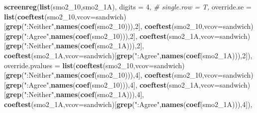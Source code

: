 \documentclass[
]{article}
\newenvironment{Shaded}{\begin{snugshade}}{\end{snugshade}}
\newcommand{\CommentTok}[1]{\textcolor[rgb]{0.56,0.35,0.01}{\textit{#1}}}
\newcommand{\DataTypeTok}[1]{\textcolor[rgb]{0.13,0.29,0.53}{#1}}
\newcommand{\DecValTok}[1]{\textcolor[rgb]{0.00,0.00,0.81}{#1}}
\newcommand{\KeywordTok}[1]{\textcolor[rgb]{0.13,0.29,0.53}{\textbf{#1}}}
\newcommand{\NormalTok}[1]{#1}
\newcommand{\StringTok}[1]{\textcolor[rgb]{0.31,0.60,0.02}{#1}}
\begin{document}
\begin{Shaded}
\begin{Highlighting}[]
\KeywordTok{screenreg}\NormalTok{(}\KeywordTok{list}\NormalTok{(smo2_}\DecValTok{10}\NormalTok{,smo2_1A), }\DataTypeTok{digits =} \DecValTok{4}\NormalTok{, }\CommentTok{# single.row = T,}
          \DataTypeTok{override.se =} \KeywordTok{list}\NormalTok{(}\KeywordTok{coeftest}\NormalTok{(smo2_}\DecValTok{10}\NormalTok{,}\DataTypeTok{vcov=}\NormalTok{sandwich)[}\KeywordTok{grep}\NormalTok{(}\StringTok{":Neither"}\NormalTok{,}\KeywordTok{names}\NormalTok{(}\KeywordTok{coef}\NormalTok{(smo2_}\DecValTok{10}\NormalTok{))),}\DecValTok{2}\NormalTok{],}
                             \KeywordTok{coeftest}\NormalTok{(smo2_}\DecValTok{10}\NormalTok{,}\DataTypeTok{vcov=}\NormalTok{sandwich)[}\KeywordTok{grep}\NormalTok{(}\StringTok{":Agree"}\NormalTok{,}\KeywordTok{names}\NormalTok{(}\KeywordTok{coef}\NormalTok{(smo2_}\DecValTok{10}\NormalTok{))),}\DecValTok{2}\NormalTok{],}
                             \KeywordTok{coeftest}\NormalTok{(smo2_1A,}\DataTypeTok{vcov=}\NormalTok{sandwich)[}\KeywordTok{grep}\NormalTok{(}\StringTok{":Neither"}\NormalTok{,}\KeywordTok{names}\NormalTok{(}\KeywordTok{coef}\NormalTok{(smo2_1A))),}\DecValTok{2}\NormalTok{],}
                             \KeywordTok{coeftest}\NormalTok{(smo2_1A,}\DataTypeTok{vcov=}\NormalTok{sandwich)[}\KeywordTok{grep}\NormalTok{(}\StringTok{":Agree"}\NormalTok{,}\KeywordTok{names}\NormalTok{(}\KeywordTok{coef}\NormalTok{(smo2_1A))),}\DecValTok{2}\NormalTok{]),}
          \DataTypeTok{override.pvalues =} \KeywordTok{list}\NormalTok{(}\KeywordTok{coeftest}\NormalTok{(smo2_}\DecValTok{10}\NormalTok{,}\DataTypeTok{vcov=}\NormalTok{sandwich)[}\KeywordTok{grep}\NormalTok{(}\StringTok{":Neither"}\NormalTok{,}\KeywordTok{names}\NormalTok{(}\KeywordTok{coef}\NormalTok{(smo2_}\DecValTok{10}\NormalTok{))),}\DecValTok{4}\NormalTok{],}
                                  \KeywordTok{coeftest}\NormalTok{(smo2_}\DecValTok{10}\NormalTok{,}\DataTypeTok{vcov=}\NormalTok{sandwich)[}\KeywordTok{grep}\NormalTok{(}\StringTok{":Agree"}\NormalTok{,}\KeywordTok{names}\NormalTok{(}\KeywordTok{coef}\NormalTok{(smo2_}\DecValTok{10}\NormalTok{))),}\DecValTok{4}\NormalTok{],}
                                  \KeywordTok{coeftest}\NormalTok{(smo2_1A,}\DataTypeTok{vcov=}\NormalTok{sandwich)[}\KeywordTok{grep}\NormalTok{(}\StringTok{":Neither"}\NormalTok{,}\KeywordTok{names}\NormalTok{(}\KeywordTok{coef}\NormalTok{(smo2_1A))),}\DecValTok{4}\NormalTok{],}
                                  \KeywordTok{coeftest}\NormalTok{(smo2_1A,}\DataTypeTok{vcov=}\NormalTok{sandwich)[}\KeywordTok{grep}\NormalTok{(}\StringTok{":Agree"}\NormalTok{,}\KeywordTok{names}\NormalTok{(}\KeywordTok{coef}\NormalTok{(smo2_1A))),}\DecValTok{4}\NormalTok{]),}

\end{Highlighting}
\end{Shaded}
\end{document}
